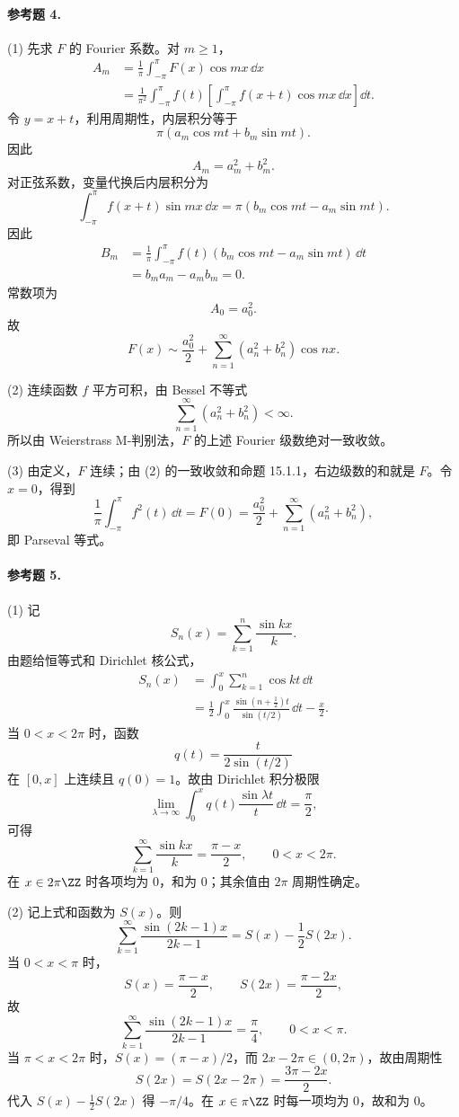 \paragraph{参考题 4.}
\begin{xsolution}
(1) 先求 $F$ 的 Fourier 系数。对 $m\ge1$，
\begin{align*}
  A_m
  &=\frac1\pi\int_{-\pi}^{\pi}F(x)\cos mx\,\dd x\\
  &=\frac1{\pi^2}\int_{-\pi}^{\pi}f(t)
    \left[\int_{-\pi}^{\pi}f(x+t)\cos mx\,\dd x\right]\dd t.
\end{align*}
令 $y=x+t$，利用周期性，内层积分等于
\[
  \pi(a_m\cos mt+b_m\sin mt).
\]
因此
\[
  A_m=a_m^2+b_m^2.
\]
对正弦系数，变量代换后内层积分为
\[
  \int_{-\pi}^{\pi}f(x+t)\sin mx\,\dd x
  =\pi(b_m\cos mt-a_m\sin mt).
\]
因此
\begin{align*}
  B_m
  &=\frac1\pi\int_{-\pi}^{\pi}
    f(t)(b_m\cos mt-a_m\sin mt)\,\dd t\\
  &=b_ma_m-a_mb_m=0.
\end{align*}
常数项为
\[
  A_0=a_0^2.
\]
故
\[
  \boxed{\displaystyle
  F(x)\sim\frac{a_0^2}{2}
  +\sum_{n=1}^{\infty}(a_n^2+b_n^2)\cos nx }.
\]

(2) 连续函数 $f$ 平方可积，由 Bessel 不等式
\[
  \sum_{n=1}^{\infty}(a_n^2+b_n^2)<\infty.
\]
所以由 Weierstrass M-判别法，$F$ 的上述 Fourier 级数绝对一致收敛。

(3) 由定义，$F$ 连续；由 (2) 的一致收敛和命题 15.1.1，右边级数的和就是 $F$。令 $x=0$，得到
\[
  \frac1\pi\int_{-\pi}^{\pi}f^2(t)\,\dd t
  =F(0)=\frac{a_0^2}{2}+\sum_{n=1}^{\infty}(a_n^2+b_n^2),
\]
即 Parseval 等式。
\end{xsolution}

\paragraph{参考题 5.}
\begin{xsolution}
(1) 记
\[
  S_n(x)=\sum_{k=1}^{n}\frac{\sin kx}{k}.
\]
由题给恒等式和 Dirichlet 核公式，
\begin{align*}
  S_n(x)
  &=\int_0^x\sum_{k=1}^{n}\cos kt\,\dd t\\
  &=\frac12\int_0^x
  \frac{\sin(n+\frac12)t}{\sin(t/2)}\,\dd t-\frac x2.
\end{align*}
当 $0<x<2\pi$ 时，函数
\[
  q(t)=\frac{t}{2\sin(t/2)}
\]
在 $[0,x]$ 上连续且 $q(0)=1$。故由 Dirichlet 积分极限
\[
  \lim_{\lambda\to\infty}\int_0^xq(t)\frac{\sin\lambda t}{t}\,\dd t=\frac\pi2,
\]
可得
\[
  \boxed{\displaystyle
  \sum_{k=1}^{\infty}\frac{\sin kx}{k}=\frac{\pi-x}{2},
  \qquad0<x<2\pi }.
\]
在 $x\in2\pi\ZZ$ 时各项均为 $0$，和为 $0$；其余值由 $2\pi$ 周期性确定。

(2) 记上式和函数为 $S(x)$。则
\[
  \sum_{k=1}^{\infty}\frac{\sin(2k-1)x}{2k-1}
  =S(x)-\frac12S(2x).
\]
当 $0<x<\pi$ 时，
\[
  S(x)=\frac{\pi-x}{2},\qquad
  S(2x)=\frac{\pi-2x}{2},
\]
故
\[
  \boxed{\displaystyle
  \sum_{k=1}^{\infty}\frac{\sin(2k-1)x}{2k-1}=\frac\pi4,
  \qquad0<x<\pi }.
\]
当 $\pi<x<2\pi$ 时，$S(x)=(\pi-x)/2$，而 $2x-2\pi\in(0,2\pi)$，故由周期性
\[
  S(2x)=S(2x-2\pi)=\frac{3\pi-2x}{2}.
\]
代入 $S(x)-\frac12S(2x)$ 得 $-\pi/4$。在 $x\in\pi\ZZ$ 时每一项均为 $0$，故和为 $0$。
\end{xsolution}


